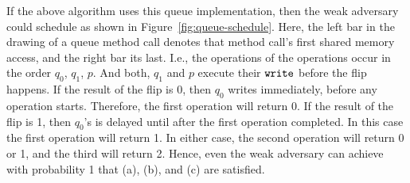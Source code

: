 \documentclass[11pt,letterpaper]{article}
\newcommand{\xwrite}{\text{\tt write}\xspace}
\newcommand{\fetchInc}{\text{\tt fetch\&inc}\xspace}
\begin{document}
If the above algorithm uses this queue implementation, then the weak adversary could schedule as shown in Figure~\ref{fig:queue-schedule}.
Here, the left bar in the drawing of a queue method call denotes that method call's first shared memory access, and the right bar its last.
I.e., the \fetchInc operations of the \Enqueue operations occur in the order $q_0$, $q_1$, $p$.
And both, $q_1$ and $p$ execute their $\xwrite$ before the flip happens.
If the result of the flip is 0, then $q_0$ writes immediately, before any \Dequeue operation starts.
Therefore, the first \Dequeue operation will return 0.
If the result of the flip is 1, then $q_0$'s \xwrite is delayed until after the first \Dequeue operation completed.
In this case the first \Dequeue operation will return 1.
In either case, the second \Dequeue operation will return 0 or 1, and the third will return 2.
Hence, even the weak adversary can achieve with probability 1 that (a), (b), and (c) are satisfied.
\end{document}
